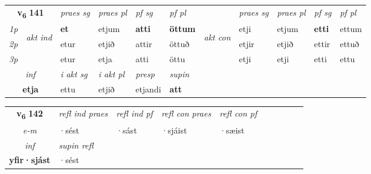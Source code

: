 \noindent
\begin{tabular}{lllllllllll} \toprule
\multicolumn{2}{c}{\textbf{v{\textsubscript{6}}} \Large{\textbf{141}}}  &  \textit{praes sg}  & \textit{praes pl}  &\textit{ pf sg} & \textit{pf pl} &  &  \textit{praes sg}  & \textit{praes pl}  & \textit{pf sg} & \textit{pf pl } \\*
	\cmidrule{3-6} \cmidrule{8-11}
 {\textit{1p}} & \multirow{3}{*}{\begin{turn}{90}\textit{akt ind}\end{turn}} & \textbf{et} & etjum & \textbf{atti} & \textbf{öttum} & \multirow{3}{*}{\begin{turn}{90}\textit{akt con}\end{turn}} &etji & etjum & \textbf{etti} & ettum\\*
 {\textit{2p}} &  &  etur  & etjið & attir & öttuð & & etjir & etjið & ettir & ettuð \\*
{\textit{3p}} &  & etur & etja & atti & öttu & & etji & etji& etti & ettu \\*
\cmidrule{3-6} \cmidrule{8-11}

   \multicolumn{2}{c}{\textit{inf}}  & \textit{i akt sg} & \textit{i akt pl}   & \textit{presp} & \textit{supin}   \\*
  \multicolumn{2}{c}{\textbf{etja}} & ettu  & etjið   & etjandi &  \textbf{att}   \\*
\end{tabular}

\noindent
\begin{tabular}{lllllllllll} \toprule
\multicolumn{2}{c}{\textbf{v{\textsubscript{6}}} \Large{\textbf{142}}}  & \textit{refl ind praes} & \textit{refl ind pf} & \textit{refl con praes} & \textit{refl con pf} \\*
 \multicolumn{2}{c}{ \textit{e-m} }& ·sést & ·sást & ·sjáist & ·sæist \\*

\cmidrule{3-3}
   \multicolumn{2}{c}{\textit{inf}}       & \textit{supin refl}  \\*
  \multicolumn{2}{c}{\textbf{yfir\allowbreak ·sjást}}        & ·sést  \\*
\end{tabular}

